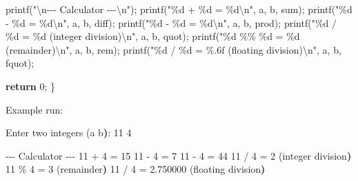 \documentclass[
  letterpaper,
  DIV=11,
  numbers=noendperiod]{scrreprt}
\newenvironment{Shaded}{\begin{snugshade}}{\end{snugshade}}
\newcommand{\AttributeTok}[1]{\textcolor[rgb]{0.40,0.45,0.13}{#1}}
\newcommand{\BuiltInTok}[1]{\textcolor[rgb]{0.00,0.23,0.31}{#1}}
\newcommand{\ControlFlowTok}[1]{\textcolor[rgb]{0.00,0.23,0.31}{\textbf{#1}}}
\newcommand{\DecValTok}[1]{\textcolor[rgb]{0.68,0.00,0.00}{#1}}
\newcommand{\ErrorTok}[1]{\textcolor[rgb]{0.68,0.00,0.00}{#1}}
\newcommand{\ExtensionTok}[1]{\textcolor[rgb]{0.00,0.23,0.31}{#1}}
\newcommand{\KeywordTok}[1]{\textcolor[rgb]{0.00,0.23,0.31}{\textbf{#1}}}
\newcommand{\NormalTok}[1]{\textcolor[rgb]{0.00,0.23,0.31}{#1}}
\newcommand{\OperatorTok}[1]{\textcolor[rgb]{0.37,0.37,0.37}{#1}}
\newcommand{\SpecialCharTok}[1]{\textcolor[rgb]{0.37,0.37,0.37}{#1}}
\newcommand{\StringTok}[1]{\textcolor[rgb]{0.13,0.47,0.30}{#1}}
\begin{document}
\begin{Shaded}
\begin{Highlighting}[]
\NormalTok{    printf}\OperatorTok{(}\StringTok{"}\SpecialCharTok{\textbackslash{}n}\StringTok{{-}{-}{-} Calculator {-}{-}{-}}\SpecialCharTok{\textbackslash{}n}\StringTok{"}\OperatorTok{);}
\NormalTok{    printf}\OperatorTok{(}\StringTok{"}\SpecialCharTok{\%d}\StringTok{ + }\SpecialCharTok{\%d}\StringTok{ = }\SpecialCharTok{\%d\textbackslash{}n}\StringTok{"}\OperatorTok{,}\NormalTok{ a}\OperatorTok{,}\NormalTok{ b}\OperatorTok{,}\NormalTok{ sum}\OperatorTok{);}
\NormalTok{    printf}\OperatorTok{(}\StringTok{"}\SpecialCharTok{\%d}\StringTok{ {-} }\SpecialCharTok{\%d}\StringTok{ = }\SpecialCharTok{\%d\textbackslash{}n}\StringTok{"}\OperatorTok{,}\NormalTok{ a}\OperatorTok{,}\NormalTok{ b}\OperatorTok{,}\NormalTok{ diff}\OperatorTok{);}
\NormalTok{    printf}\OperatorTok{(}\StringTok{"}\SpecialCharTok{\%d}\StringTok{ {-} }\SpecialCharTok{\%d}\StringTok{ = }\SpecialCharTok{\%d\textbackslash{}n}\StringTok{"}\OperatorTok{,}\NormalTok{ a}\OperatorTok{,}\NormalTok{ b}\OperatorTok{,}\NormalTok{ prod}\OperatorTok{);}
\NormalTok{    printf}\OperatorTok{(}\StringTok{"}\SpecialCharTok{\%d}\StringTok{ / }\SpecialCharTok{\%d}\StringTok{ = }\SpecialCharTok{\%d}\StringTok{ (integer division)}\SpecialCharTok{\textbackslash{}n}\StringTok{"}\OperatorTok{,}\NormalTok{ a}\OperatorTok{,}\NormalTok{ b}\OperatorTok{,}\NormalTok{ quot}\OperatorTok{);}
\NormalTok{    printf}\OperatorTok{(}\StringTok{"}\SpecialCharTok{\%d}\StringTok{ }\SpecialCharTok{\%\%}\StringTok{ }\SpecialCharTok{\%d}\StringTok{ = }\SpecialCharTok{\%d}\StringTok{ (remainder)}\SpecialCharTok{\textbackslash{}n}\StringTok{"}\OperatorTok{,}\NormalTok{ a}\OperatorTok{,}\NormalTok{ b}\OperatorTok{,}\NormalTok{ rem}\OperatorTok{);}
\NormalTok{    printf}\OperatorTok{(}\StringTok{"}\SpecialCharTok{\%d}\StringTok{ / }\SpecialCharTok{\%d}\StringTok{ = }\SpecialCharTok{\%.6f}\StringTok{ (floating division)}\SpecialCharTok{\textbackslash{}n}\StringTok{"}\OperatorTok{,}\NormalTok{ a}\OperatorTok{,}\NormalTok{ b}\OperatorTok{,}\NormalTok{ fquot}\OperatorTok{);}

    \ControlFlowTok{return} \DecValTok{0}\OperatorTok{;}
\OperatorTok{\}}
\end{Highlighting}
\end{Shaded}

Example run:

\begin{Shaded}
\begin{Highlighting}[]
\ExtensionTok{Enter}\NormalTok{ two integers }\ErrorTok{(}\ExtensionTok{a}\NormalTok{ b}\KeywordTok{)}\BuiltInTok{:}\NormalTok{ 11 4}

\ExtensionTok{{-}{-}{-}}\NormalTok{ Calculator }\AttributeTok{{-}{-}{-}}
\ExtensionTok{11}\NormalTok{ + 4 = 15}
\ExtensionTok{11} \AttributeTok{{-}}\NormalTok{ 4 = 7}
\ExtensionTok{11} \AttributeTok{{-}}\NormalTok{ 4 = 44}
\ExtensionTok{11}\NormalTok{ / 4 = 2 }\ErrorTok{(}\ExtensionTok{integer}\NormalTok{ division}\KeywordTok{)}
\ExtensionTok{11}\NormalTok{ \% 4 = 3 }\ErrorTok{(}\ExtensionTok{remainder}\KeywordTok{)}
\ExtensionTok{11}\NormalTok{ / 4 = 2.750000 }\ErrorTok{(}\ExtensionTok{floating}\NormalTok{ division}\KeywordTok{)}
\end{Highlighting}
\end{Shaded}
\end{document}
